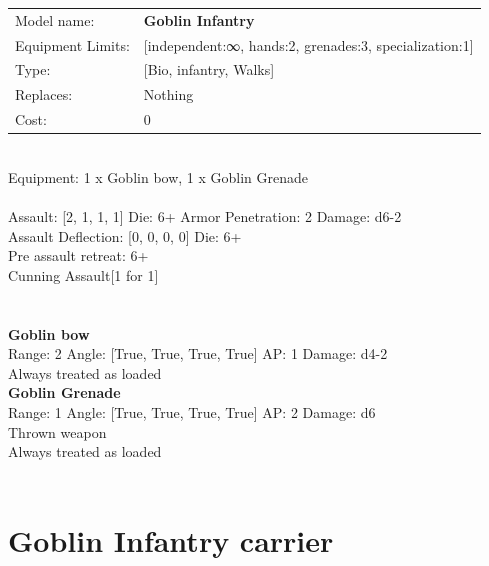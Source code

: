 \noindent
\begin{tabular}{ll}
Model name: &{\bf Goblin Infantry } \\
Equipment Limits: &[independent:∞, hands:2, grenades:3, specialization:1] \\
Type: &[Bio, infantry, Walks] \\
Replaces: &Nothing \\
Cost: & 0\\
\end{tabular}
\ \\
Equipment: 1 x Goblin bow, 1 x Goblin Grenade \\
\ \\
Assault: [2, 1, 1, 1] Die: 6+ Armor Penetration: 2 Damage: d6-2 \\
Assault Deflection: [0, 0, 0, 0] Die: 6+\\
\indent Pre assault retreat: 6+\\ 
Cunning Assault[1 for 1]\\ 
 
\ \\

\ \\
{\bf Goblin bow } \\



Range: 2  Angle: [True, True, True, True] AP: 1 Damage: d4-2 \\
Always treated as loaded\\ 




{\bf Goblin Grenade } \\



Range: 1  Angle: [True, True, True, True] AP: 2 Damage: d6 \\
Thrown weapon\\ 
Always treated as loaded\\ 




 
\ \\













\clearpage

\section{ Goblin Infantry carrier }

